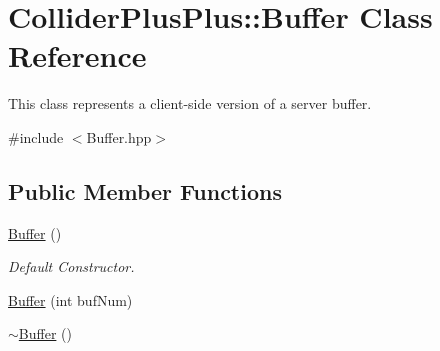 \hypertarget{classColliderPlusPlus_1_1Buffer}{\section{Collider\-Plus\-Plus\-:\-:Buffer Class Reference}
\label{classColliderPlusPlus_1_1Buffer}
}


This class represents a client-\/side version of a server buffer.  




{\ttfamily \#include $<$Buffer.\-hpp$>$}

\subsection*{Public Member Functions}
\begin{DoxyCompactItemize}
\item 
\hypertarget{classColliderPlusPlus_1_1Buffer_ae7ef2cd201190fde551dcb902627112b}{\hyperlink{classColliderPlusPlus_1_1Buffer_ae7ef2cd201190fde551dcb902627112b}{Buffer} ()}\label{classColliderPlusPlus_1_1Buffer_ae7ef2cd201190fde551dcb902627112b}

\begin{DoxyCompactList}\small\item\em Default Constructor. \end{DoxyCompactList}\item 
\hyperlink{classColliderPlusPlus_1_1Buffer_aea5b364a9ec1815f0dd3746d8577a986}{Buffer} (int buf\-Num)
\item 
\hypertarget{classColliderPlusPlus_1_1Buffer_a59b8743e4a5f731bdd0c4185c9ef263b}{\hyperlink{classColliderPlusPlus_1_1Buffer_a59b8743e4a5f731bdd0c4185c9ef263b}{$\sim$\-Buffer} ()}\label{classColliderPlusPlus_1_1Buffer_a59b8743e4a5f731bdd0c4185c9ef263b}


\end{DoxyCompactItemize}
